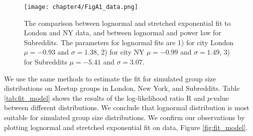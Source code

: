 \begin{figure}[ht]
	\centering
	\texttt{[image: chapter4/FigA1\_data.png]}
	\caption[The fitting of empirical group size distributions.]{The comparison between lognormal and stretched exponential fit to London and NY data,  and between lognormal and power law for Subreddits. The parameters for lognormal fits are 1) for city London $\mu=-0.93$ and $\sigma = 1.38$, 2) for city NY $\mu=-0.99$ and $\sigma = 1.49$, 3) for Subreddits $\mu=-5.41$ and $\sigma = 3.07$.  }
	\label{fig:fitdata}
\end{figure}

We use the same methods to estimate the fit for simulated group size distributions on Meetup groups in London, New York, and Subreddits. Table \ref{tab:fit_model} shows the results of the log-likelihood ratio R and $p$-value between different distributions. We conclude that lognormal distribution is most suitable for simulated group size distributions. We confirm our observations by plotting lognormal and stretched exponential fit on data, Figure \ref{fig:fit_model}.  

